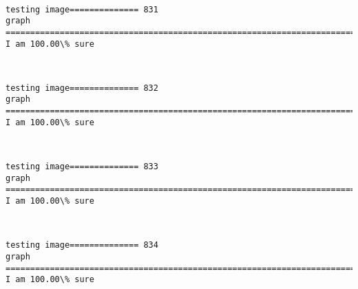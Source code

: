 \documentclass[11pt]{article}
\begin{document}
    \begin{center}
    \end{center}
    { \hspace*{\fill} \\}
    
    \begin{Verbatim}[commandchars=\\\{\}]
testing image============== 831
graph
============================================================================
I am 100.00\% sure

    \end{Verbatim}

    \begin{center}
    \end{center}
    { \hspace*{\fill} \\}
    
    \begin{Verbatim}[commandchars=\\\{\}]
testing image============== 832
graph
============================================================================
I am 100.00\% sure

    \end{Verbatim}

    \begin{center}
    \end{center}
    { \hspace*{\fill} \\}
    
    \begin{Verbatim}[commandchars=\\\{\}]
testing image============== 833
graph
============================================================================
I am 100.00\% sure

    \end{Verbatim}

    \begin{center}
    \end{center}
    { \hspace*{\fill} \\}
    
    \begin{Verbatim}[commandchars=\\\{\}]
testing image============== 834
graph
============================================================================
I am 100.00\% sure

    \end{Verbatim}
\end{document}
